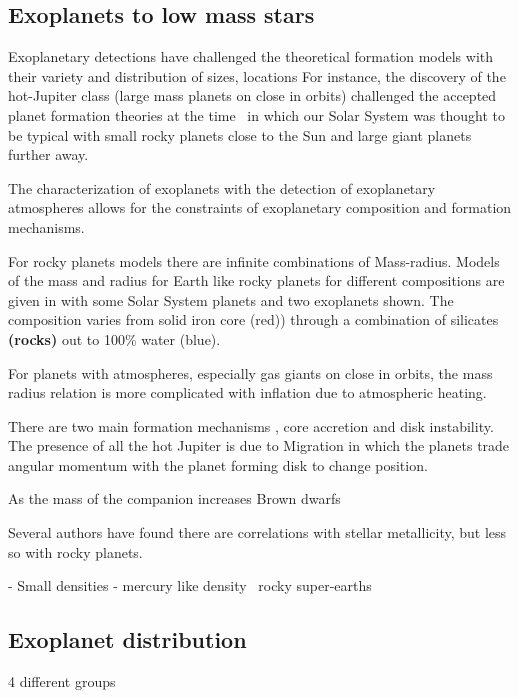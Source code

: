 
\subsection{Exoplanets to low mass stars}

Exoplanetary detections have challenged the theoretical formation models with their variety and distribution of sizes, locations For instance, the discovery of the hot-Jupiter class (large mass planets on close in orbits) challenged the accepted planet formation theories at the time~\citep[.e.g][]{pollack_formation_1996} in which our Solar System was thought to be typical with small rocky planets close to the Sun and large giant planets further away.

The characterization of exoplanets with the detection of exoplanetary atmospheres allows for the constraints of exoplanetary composition and formation mechanisms.

For rocky planets models there are infinite combinations of Mass-radius. 
Models of the mass and radius for Earth like rocky planets for different compositions are given in  with some Solar System planets and two exoplanets shown.
The composition varies from solid iron core (red)) through a combination of silicates \textbf{(rocks)} out to 100\% water (blue).


For planets with atmospheres, especially gas giants on close in orbits, the mass radius relation is more complicated with inflation due to atmospheric heating.



There are two main formation mechanisms , core accretion and disk instability.
The presence of all the hot Jupiter is due to Migration in which the planets trade angular momentum with the planet forming disk to change position.

As the mass of the companion increases
Brown dwarfs

Several authors have found there are correlations with stellar metallicity, but less so with rocky planets.


- Small densities - mercury like  density~\citet{dittmann_temperate_2017, santerne_earthsized_2018, ment_second_2018} rocky super-earths\\


\subsection{Exoplanet distribution} 4 different groups


